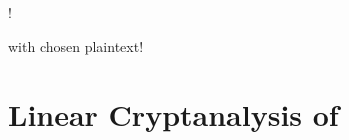 \documentclass[aspectratio=169,9pt]{beamer}
\begin{document}
\begin{frame}{\MiniMORUS!}

\begin{figure}[h]
  \substatesfalse
  \centering
  \resizebox{!}{0.8\textheight}{%
  
  }
\end{figure}

\end{frame}


\begin{frame}{\MiniMORUS with chosen plaintext!}

\begin{figure}[h]
  \substatesfalse
  \centering
  \resizebox{!}{0.8\textheight}{%
  
  }
\end{figure}
\end{frame}


\section{Linear Cryptanalysis of \MiniMORUS}


\end{document}
